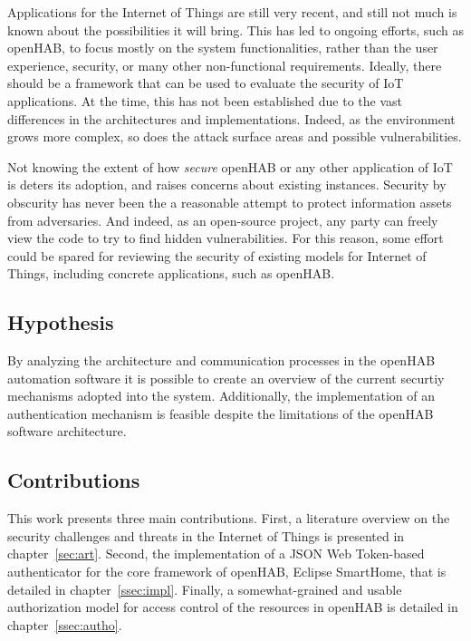 \documentclass[12pt]{article}
\begin{document}
Applications for the Internet of Things are still very recent, and still not much is known about the possibilities it will bring. This has led to ongoing efforts, such as openHAB, to focus mostly on the system functionalities, rather than the user experience, security, or many other non-functional requirements. Ideally, there should be a framework that can be used to evaluate the security of IoT applications. At the time, this has not been established due to the vast differences in the architectures and implementations. Indeed, as the environment grows more complex, so does the attack surface areas and possible vulnerabilities.

Not knowing the extent of how \emph{secure} openHAB or any other application of IoT is deters its adoption, and raises concerns about existing instances. Security by obscurity has never been the a reasonable attempt to protect information assets from adversaries. And indeed, as an open-source project, any party can freely view the code to try to find hidden vulnerabilities. For this reason, some effort could be spared for reviewing the security of existing models for Internet of Things, including concrete applications, such as openHAB.

\subsection{Hypothesis}

By analyzing the architecture and communication processes in the openHAB automation software it is possible to create an overview of the current securtiy mechanisms adopted into the system. Additionally, the implementation of an authentication mechanism is feasible despite the limitations of the openHAB software architecture.

\subsection{Contributions}

This work presents three main contributions. First, a literature overview on the security challenges and threats in the Internet of Things is presented in chapter~\ref{sec:art}. Second, the implementation of a JSON Web Token-based authenticator for the core framework of openHAB, Eclipse SmartHome, that is detailed in chapter~\ref{ssec:impl}. Finally, a somewhat-grained and usable authorization model for access control of the resources in openHAB is detailed in chapter~\ref{ssec:autho}.
\end{document}

